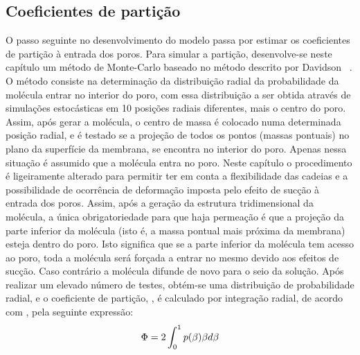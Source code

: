 \subsection{Coeficientes de partição}
%
%
%
O passo seguinte no desenvolvimento do modelo passa por estimar os coeficientes de partição à entrada dos poros. Para simular a partição, desenvolve-se neste capítulo um método de Monte-Carlo baseado no método descrito por Davidson \et\ \cite{davidson87}.
%
O método consiste na determinação da distribuição radial da probabilidade da molécula entrar no interior do poro, com essa distribuição a ser obtida através de simulações estocásticas em 10 posições radiais diferentes, mais o centro do poro. Assim, após gerar a molécula, o centro de massa é colocado numa determinada posição radial, e é testado se a projeção de todos os pontos (massas pontuais) no plano da superfície da membrana, se encontra no interior do poro. Apenas nessa situação é assumido que a molécula entra no poro. Neste capítulo o procedimento é ligeiramente alterado para permitir ter em conta a flexibilidade das cadeias e a possibilidade de ocorrência de deformação imposta pelo efeito de sucção à entrada dos poros. Assim, após a geração da estrutura tridimensional da molécula, a única obrigatoriedade para que haja permeação é que a projeção da parte inferior da molécula (isto é, a massa pontual mais próxima da membrana) esteja dentro do poro.
%
Isto significa que se a parte inferior da molécula tem acesso ao poro, toda a molécula será forçada a entrar no mesmo devido aos efeitos de sucção. Caso contrário a molécula difunde de novo para o seio da solução. Após realizar um elevado número de testes, obtém-se uma distribuição de probabilidade radial, e o coeficiente de partição, \particao, é calculado por integração radial, de acordo com \cite{davidson87}, pela seguinte expressão:
%
\begin{equation}%
\label{eq:13art1}
\particao=2\int_{0}^{1} p(\radialadimensional)\radialadimensional d\radialadimensional
\end{equation}%
